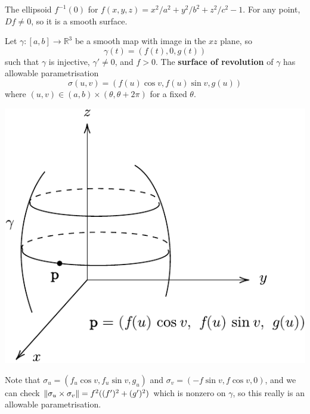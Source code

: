 \documentclass[a4paper,11pt]{article}
\begin{document}
\begin{example}
	The ellipsoid \( f^{-1}(0) \) for \( f(x,y,z) = x^2/a^2 + y^2/b^2 + z^2/c^2 - 1 \).
	For any point, \( Df \neq 0 \), so it is a smooth surface.
\end{example}
\begin{example}
	Let \( \gamma \colon [a,b] \to \mathbb R^3 \) be a smooth map with image in the \( xz \) plane, so
	\[
		\gamma(t) = (f(t), 0, g(t))
	\]
	such that \( \gamma \) is injective, \( \gamma' \neq 0 \), and \( f > 0 \).
	The \textbf{surface of revolution} of \( \gamma \) has allowable parametrisation
	\[
		\sigma(u,v) = (f(u)\cos v, f(u)\sin v, g(u))
	\]
	where \( (u,v) \in (a,b) \times (\theta, \theta + 2\pi) \) for a fixed \( \theta \).
	\begin{center}
	\includegraphics[scale=0.8]{SoR}
	\end{center}
	Note that \( \sigma_u = (f_u \cos v, f_u \sin v, g_u) \) and \( \sigma_v = (-f\sin v, f \cos v, 0) \), and we can check \( \norm{\sigma_u \times \sigma_v} = f^2 ((f')^2 + (g')^2) \) which is nonzero on \( \gamma \), so this really is an allowable parametrisation.
\end{example}
\end{document}
